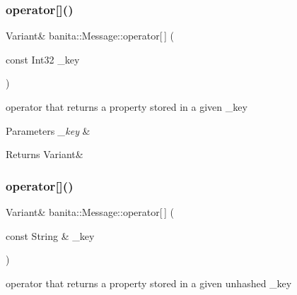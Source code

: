 \mbox{\label{classbanita_1_1_message_a68cb40efc158cc95be690c2a0f78843e}} 
\subsubsection{\texorpdfstring{operator[]()}{operator[]()}\hspace{0.1cm}{\footnotesize\ttfamily [1/2]}}
{\footnotesize\ttfamily Variant\& banita\+::\+Message\+::operator\mbox{[}$\,$\mbox{]} (\begin{DoxyParamCaption}\item[{const Int32}]{\+\_\+key }\end{DoxyParamCaption})\hspace{0.3cm}{\ttfamily [inline]}}



operator that returns a property stored in a given \+\_\+key 


\begin{DoxyParams}{Parameters}
{\em \+\_\+key} & \\
\hline
\end{DoxyParams}
\begin{DoxyReturn}{Returns}
Variant\& 
\end{DoxyReturn}
\mbox{\label{classbanita_1_1_message_afd7d83bc7864713a4e0654b39f633263}} 
\subsubsection{\texorpdfstring{operator[]()}{operator[]()}\hspace{0.1cm}{\footnotesize\ttfamily [2/2]}}
{\footnotesize\ttfamily Variant\& banita\+::\+Message\+::operator\mbox{[}$\,$\mbox{]} (\begin{DoxyParamCaption}\item[{const String \&}]{\+\_\+key }\end{DoxyParamCaption})\hspace{0.3cm}{\ttfamily [inline]}}



operator that returns a property stored in a given unhashed \+\_\+key 


